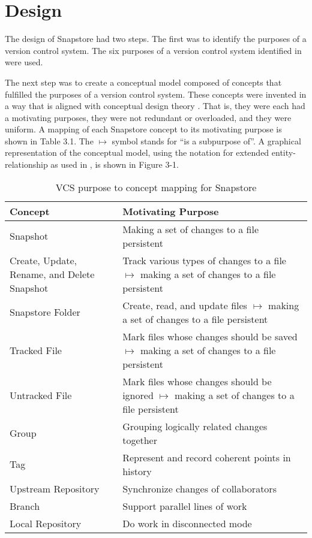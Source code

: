 \chapter{Design}

The design of Snapstore had two steps. The first was to identify the purposes of a version control system. The six purposes of a version control system identified in \cite{RossoJackson} were used.

The next step was to create a conceptual model composed of concepts that fulfilled the purposes of a version control system. These concepts were invented in a way that is aligned with conceptual design theory \cite{Jackson}. That is, they were each had a motivating purposes, they were not redundant or overloaded, and they were uniform. A mapping of each Snapstore concept to its motivating purpose is shown in Table 3.1. The $\mapsto$ symbol stands for ``is a subpurpose of''. A graphical representation of the conceptual model, using the notation for extended entity-relationship as used in \cite{Jackson}, is shown in Figure 3-1.

\vspace{6mm}

\begin{table}
\begin{tabular}{ |p{6cm}||p{9cm}|  }
 \hline
 \textbf{Concept} & \textbf{Motivating Purpose} \\[8pt]
 \hline
 Snapshot & Making a set of changes to a file persistent\\[8pt]
 Create, Update, Rename, and Delete Snapshot & Track various types of changes to a file $\mapsto$ making a set of changes to a file persistent\\[8pt]
 Snapstore Folder & Create, read, and update files $\mapsto$ making a set of changes to a file persistent\\[8pt]
 Tracked File & Mark files whose changes should be saved $\mapsto$ making a set of changes to a file persistent\\[8pt]
 Untracked File & Mark files whose changes should be ignored $\mapsto$ making a set of changes to a file persistent\\[8pt]
 \hline
 Group & Grouping logically related changes together\\[8pt]
 Tag & Represent and record coherent points in history\\[8pt]
 \hline
 Upstream Repository & Synchronize changes of collaborators\\[8pt]
 Branch & Support parallel lines of work\\[8pt]
 Local Repository & Do work in disconnected mode\\[8pt]
 \hline
\end{tabular}
\caption{VCS purpose to concept mapping for Snapstore}
\end{table}

